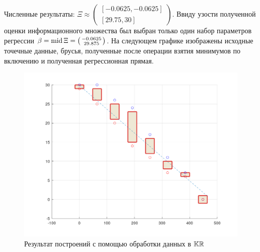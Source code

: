 \documentclass[a4paper]{article}
\begin{document}
Численные результаты: $\Xi\approx\left(\begin{smallmatrix}[-0.0625,-0.0625]\\ [29.75,30]\end{smallmatrix}\right)$. Ввиду узости полученной оценки информационного множества был выбран только один набор параметров регрессии $\beta=\operatorname{mid}\Xi=\left(\begin{smallmatrix}-0.0625\\ 29.875\end{smallmatrix}\right)$. На следующем графике изображены исходные точечные данные, брусья, полученные после операции взятия минимумов по включению и полученная регрессионная прямая.
\begin{figure}[H]
    \centering
    \includegraphics[width=15cm]{img/res_3.png}
    \caption{Результат построений с помощью обработки данных в $\mathbb{KR}$}
    \label{fig:res_3}
\end{figure}
\end{document}
